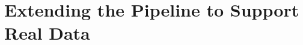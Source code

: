 















\section{Extending the Pipeline to Support Real Data} \label{sec:extending-real-data}

\begin{comment}
Premise: Have a working pipeline to collect, train and render novel views from CARLA
Question: How can this pipeline be extended to enable input of real data?

\begin{itemize}
    \item How to collect images and camera poses from the car?
    \item Which changes had to be done to the pipeline to support this change?
\end{itemize}
\end{comment}

%

